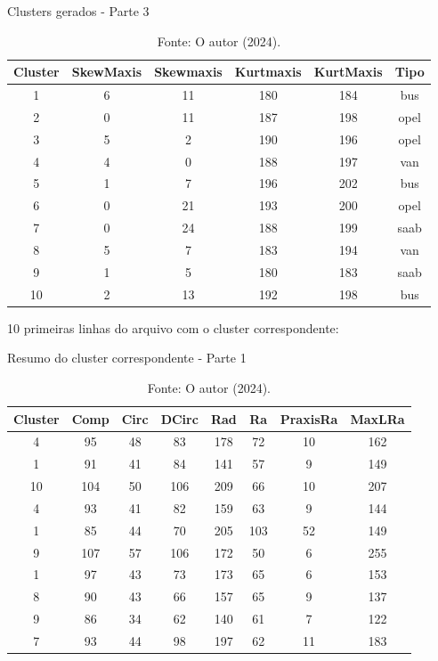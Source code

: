 \begin{table}[H]
\centering
\caption{Clusters gerados - Parte 3}
\begin{tabular}{|c|c|c|c|c|c|}
\hline
Cluster & SkewMaxis & Skewmaxis & Kurtmaxis & KurtMaxis & Tipo \\ \hline
1  & 6  & 11 & 180 & 184 & bus  \\ \hline
2  & 0  & 11 & 187 & 198 & opel \\ \hline
3  & 5  & 2  & 190 & 196 & opel \\ \hline
4  & 4  & 0  & 188 & 197 & van  \\ \hline
5  & 1  & 7  & 196 & 202 & bus  \\ \hline
6  & 0  & 21 & 193 & 200 & opel \\ \hline
7  & 0  & 24 & 188 & 199 & saab \\ \hline
8  & 5  & 7  & 183 & 194 & van  \\ \hline
9  & 1  & 5  & 180 & 183 & saab \\ \hline
10 & 2  & 13 & 192 & 198 & bus  \\ \hline
\end{tabular}
\caption*{Fonte: O autor (2024).}
\end{table}

10 primeiras linhas do arquivo com o cluster correspondente:

\begin{table}[H]
\centering
\caption{Resumo do cluster correspondente - Parte 1}
\begin{tabular}{|c|c|c|c|c|c|c|c|}
\hline
Cluster & Comp & Circ & DCirc & Rad & Ra & PraxisRa & MaxLRa \\ \hline
4  & 95  & 48  & 83  & 178 & 72  & 10 & 162 \\ \hline
1  & 91  & 41  & 84  & 141 & 57  & 9  & 149 \\ \hline
10 & 104 & 50  & 106 & 209 & 66  & 10 & 207 \\ \hline
4  & 93  & 41  & 82  & 159 & 63  & 9  & 144 \\ \hline
1  & 85  & 44  & 70  & 205 & 103 & 52 & 149 \\ \hline
9  & 107 & 57  & 106 & 172 & 50  & 6  & 255 \\ \hline
1  & 97  & 43  & 73  & 173 & 65  & 6  & 153 \\ \hline
8  & 90  & 43  & 66  & 157 & 65  & 9  & 137 \\ \hline
9  & 86  & 34  & 62  & 140 & 61  & 7  & 122 \\ \hline
7  & 93  & 44  & 98  & 197 & 62  & 11 & 183 \\ \hline
\end{tabular}
\caption*{Fonte: O autor (2024).}
\end{table}

